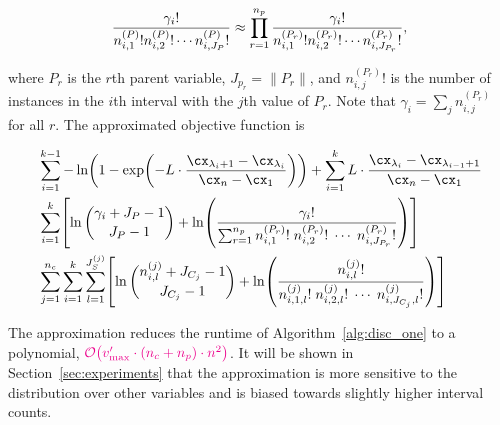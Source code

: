 \begin{equation}
{\frac{{\gamma_i}!}{ {n^{(P)}_{i,1} !} {n^{(P)}_{i,2} !} \cdots {n^{(P)}_{i,J_P} !}}} \approx \prod_{r=1}^{n_p} { {{{\gamma}_i}!}\over{ {n^{(P_r)}_{i,1} !} {n^{(P_r)}_{i,2} !} \cdots {n^{(P_r)}_{i,J_{P_r}} !}}}\text{,}
\end{equation}

\noindent
where $P_r$ is the $r$th parent variable, $J_{p_r} = \| P_r\|$, and ${n^{(P_r)}_{i,j} !}$ is the number of instances in the $i$th interval with the $j$th value of $P_r$. Note that $\gamma_i = \sum_j {n^{(P_r)}_{i,j}}$ for all $r$.
The approximated objective function is

\begin{small}
  \begin{equation}
  \label{eq:opt_prob_approx}
  \begin{aligned}
    & \sum_{i=1}^{k-1}
     - \ln
      \paren{
        1 - \exp
        \paren{
          - L \cdot  \frac{
                           \cx_{\lambda_i +1} - \cx_{\lambda_i}
                         }{
                           \cx_n - \cx_1
                          }
        }
      }
        + \sum_{i=1}^{k}
        L \cdot \frac{\cx_{\lambda_{i}} - \cx_{\lambda_{i-1} + 1}}{\cx_n - \cx_1} \\
    & \sum_{i=1}^{k} \brock{
    \ln{{\gamma_i + J_P - 1}\choose{J_P - 1}}
    +{ \ln \paren{
          \frac{
            {\gamma_i}!
          }{ \sum_{r=1}^{n_p}
            {n^{({P_r})}_{i,1}}! \; {n^{({P_r})}_{i,2}}! \; \cdots \; {n^{({P_r})}_{i,J_{P_r}}}!
          }
        }}
    } \\
    & \sum_{j=1}^{n_c} \sum_{i=1}^k \sum_{l=1}^{J^{(j)}_S} \brock{
    { \ln
            {{n^{(j)}_{i,l} + J_{C_j} - 1}\choose{J_{C_j}-1}}}
      +
      \ln \paren{ {
            \frac{
              {n^{(j)}_{i,l}}!
            }{
              {n^{(j)}_{i,1,l}!} \; {n^{(j)}_{i,2,l}!} \; \cdots \; {n^{(j)}_{i,J_{C_j},l}!}
            }
          }
          } }
  \end{aligned}
  \end{equation}
\end{small}

The approximation reduces the runtime of Algorithm~\ref{alg:disc_one} to a polynomial, $\todo{\bigo\paren{ {v'_\text{max}} \cdot (n_c + n_p) \cdot n^2}}$.
It will be shown in Section~\ref{sec:experiments} that the approximation is more sensitive to the distribution over other variables and is biased towards slightly higher interval counts.

